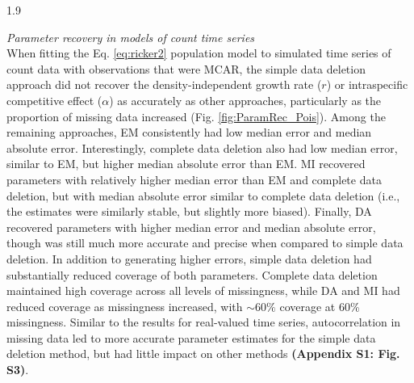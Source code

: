 \documentclass[12pt,english]{article} %
\begin{document}
\begin{linenumbers}
\begin{spacing}{1.9}
\begin{flushleft}
\textit{Parameter recovery in models of count time series} \\
\noindent When fitting the Eq. \ref{eq:ricker2} population model to simulated time series of count data with observations that were MCAR, the simple data deletion approach did not recover the density-independent growth rate ($r$) or intraspecific competitive effect ($\alpha$) as accurately as other approaches, particularly as the proportion of missing data increased (Fig. \ref{fig:ParamRec_Pois}). Among the remaining approaches, EM consistently had low median error and median absolute error. Interestingly, complete data deletion also had low median error, similar to EM, but higher median absolute error than EM. MI recovered parameters with relatively higher median error than EM and complete data deletion, but with median absolute error similar to complete data deletion (i.e., the estimates were similarly stable, but slightly more biased). Finally, DA recovered parameters with higher median error and median absolute error, though was still much more accurate and precise when compared to simple data deletion. In addition to generating higher errors, simple data deletion had substantially reduced coverage of both parameters. Complete data deletion maintained high coverage across all levels of missingness, while DA and MI had reduced coverage as missingness increased, with $\sim60\%$ coverage at 60\% missingness. Similar to the results for real-valued time series, autocorrelation in missing data led to more accurate parameter estimates for the simple data deletion method, but had little impact on other methods \textbf{(Appendix S1: Fig. S3)}.


\end{flushleft}
\end{spacing}
\end{linenumbers}
\end{document}
